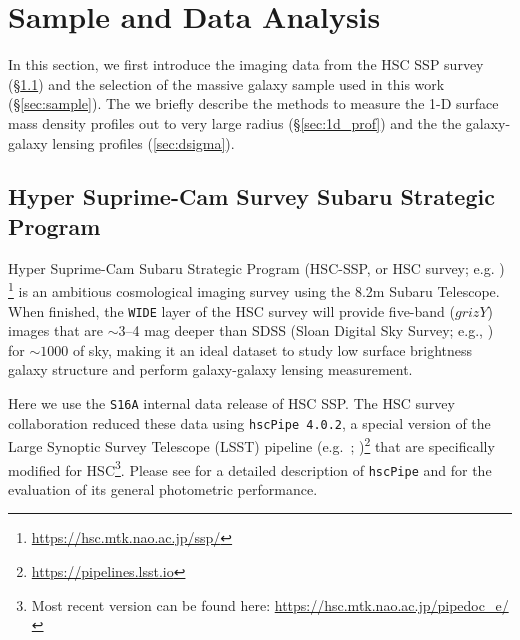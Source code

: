 \documentclass[a4paper,fleqn,usenatbib]{mnras}
\begin{document}
\section{Sample and Data Analysis}
    \label{sec:data}

    In this section, we first introduce the imaging data from the HSC SSP survey
    (\S \ref{sec:hsc}) and the selection of the massive galaxy sample used in this work 
    (\S \ref{sec:sample}).
    The we briefly describe the methods to measure the 1-D surface mass density profiles 
    out to very large radius (\S \ref{sec:1d_prof}) and the the galaxy-galaxy lensing \dsigma{} 
    profiles (\ref{sec:dsigma}).


\subsection{Hyper Suprime-Cam Survey Subaru Strategic Program}
    \label{sec:hsc}

    Hyper Suprime-Cam Subaru Strategic Program (HSC-SSP, or HSC survey; e.g. 
    \citealt{HSC-SSP, HSC-DR1, HSC-DR2})
    \footnote{\url{https://hsc.mtk.nao.ac.jp/ssp/}} is an ambitious cosmological imaging survey 
    using the 8.2m Subaru Telescope.
    When finished, the \texttt{WIDE} layer of the HSC survey will provide five-band ($grizY$)
    images that are $\sim$3--4 mag deeper than SDSS (Sloan Digital Sky Survey;
    e.g., \citealt{SDSS-DR7, SDSS-DR8, SDSS-DR12}) for $\sim 1000$ \sqdeg{} of sky, making 
    it an ideal dataset to study low surface brightness galaxy structure and perform 
    galaxy-galaxy lensing measurement. 

    Here we use the \texttt{S16A} internal data release of HSC SSP.
    The HSC survey collaboration reduced these data using \texttt{hscPipe 4.0.2}, a special
    version of the Large Synoptic Survey Telescope (LSST) pipeline (e.g.\ \citealt{Juric2015};
    \citealt{Axelrod2010})\footnote{\url{https://pipelines.lsst.io}} that are specifically
    modified for HSC\footnote{Most recent version can be found here:
    \url{https://hsc.mtk.nao.ac.jp/pipedoc_e/}}.
    Please see \citet{HSC-PIPE} for a detailed description of \texttt{hscPipe} and 
    \citet{SynPipe} for the evaluation of its general photometric performance.
\end{document}
